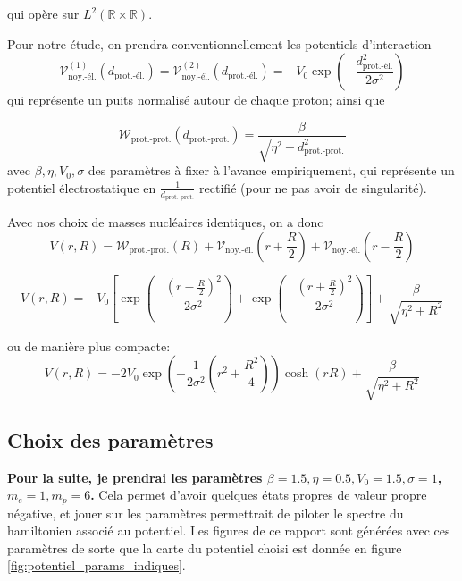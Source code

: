 \documentclass[svgnames,dvipsnames,a4paper,10pt,french]{report}
\begin{document}
qui opère sur $L^2(\mathbb{R} \times \mathbb{R})$.

Pour notre étude, on prendra conventionnellement les potentiels d'interaction
\begin{equation}
    \mathcal{V}_{\text{noy.-él.}}^{(1)}(d_{\text{prot.-él.}}) = \mathcal{V}_{\text{noy.-él.}}^{(2)}(d_{\text{prot.-él.}}) = -V_0 \exp \left( - \frac{d_{\text{prot.-él.}}^2}{2\sigma^2}\right)
\end{equation}
qui représente un puits normalisé autour de chaque proton; ainsi que

\begin{equation}
    \mathcal{W}_{\text{prot.-prot.}}(d_{\text{prot.-prot.}}) =     \frac{\beta}{\sqrt{\eta^2 + d_{\text{prot.-prot.}}^2}}
\end{equation}
avec $\beta, \eta, V_0, \sigma$ des paramètres à fixer à l'avance empiriquement, qui représente un potentiel électrostatique en $\frac{1}{d_{\text{prot.-prot.}}}$ rectifié (pour ne pas avoir de singularité).

Avec nos choix de masses nucléaires identiques, on a donc
\begin{equation}
    V(r,R) = \mathcal{W}_{\text{prot.-prot.}} (R) + \mathcal{V}_{\text{noy.-él.}}\left( r+ \frac{R}{2}\right) + \mathcal{V}_{\text{noy.-él.}}\left( r- \frac{R}{2}\right) 
\end{equation}

\begin{equation}
\label{potentiel_H2plus}
    \boxed{V(r,R) = -V_0 \left[\exp \left( - \frac{(r-\frac{R}{2})^2}{2\sigma^2}\right) + \exp \left( - \frac{(r+\frac{R}{2})^2}{2\sigma^2}\right) \right] +  \frac{\beta}{\sqrt{\eta^2 + R^2}}}
\end{equation}

ou de manière plus compacte:
\begin{equation}
    V(r,R) = -2V_0 \exp \left( -\frac{1}{2\sigma ^2}\left(r^2+\frac{R^2}{4}\right) \right) \cosh (rR) +  \frac{\beta}{\sqrt{\eta^2 + R^2}}
\end{equation}


\subsection{Choix des paramètres}

\textbf{Pour la suite, je prendrai les paramètres $\beta=1.5, \eta=0.5, V_0 = 1.5, \sigma = 1$, $m_e = 1, m_p = 6$.} Cela permet d'avoir quelques états propres de valeur propre négative, et jouer sur les paramètres permettrait de piloter le spectre du hamiltonien associé au potentiel. Les figures de ce rapport sont générées avec ces paramètres de sorte que la carte du potentiel choisi est donnée en figure \ref{fig:potentiel_params_indiques}.
\end{document}
